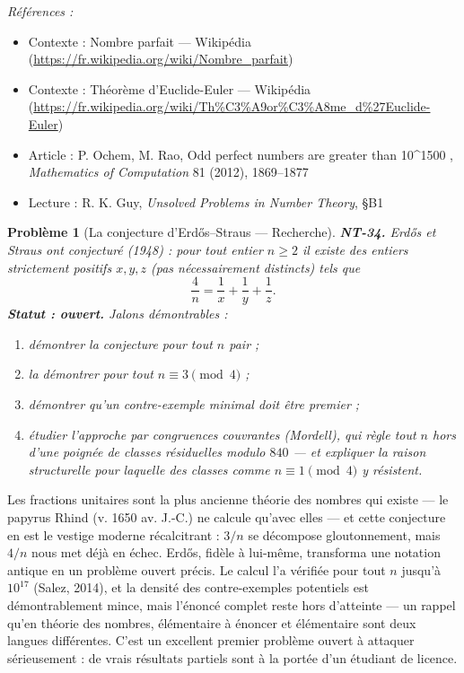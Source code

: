 \documentclass[11pt]{article}
\newtheorem{problem}{Problème}
\newenvironment{refs}{\par\small\noindent\emph{Références :}\begin{itemize}\setlength\itemsep{0pt}}{\end{itemize}\normalsize}
\begin{document}
\begin{refs}
\item Contexte : Nombre parfait --- Wikipédia (\url{https://fr.wikipedia.org/wiki/Nombre_parfait})
\item Contexte : Théorème d'Euclide-Euler --- Wikipédia (\url{https://fr.wikipedia.org/wiki/Th%C3%A9or%C3%A8me_d%27Euclide-Euler})
\item Article : P. Ochem, M. Rao, \og{} Odd perfect numbers are greater than 10\textasciicircum{}1500 \fg{}, \textit{Mathematics of Computation} 81 (2012), 1869--1877
\item Lecture : R. K. Guy, \textit{Unsolved Problems in Number Theory}, \S{}B1
\end{refs}

\bigskip

\begin{problem}[{La conjecture d'Erd\H{o}s--Straus --- Recherche}]
\textbf{NT-34.} Erd\H{o}s et Straus ont conjecturé (1948) : pour tout
entier $n \ge 2$ il existe des entiers strictement positifs $x, y, z$ (pas nécessairement
distincts) tels que
\[ \frac{4}{n} = \frac{1}{x} + \frac{1}{y} + \frac{1}{z}. \]
\textbf{Statut : ouvert.} Jalons démontrables :
\begin{enumerate}
\item[(i)] démontrer la conjecture pour tout $n$ pair ;
\item[(ii)] la démontrer pour tout $n \equiv 3 \pmod 4$ ;
\item[(iii)] démontrer qu'un contre-exemple minimal
doit être premier ;
\item[(iv)] étudier l'approche par congruences couvrantes (Mordell), qui règle
tout $n$ hors d'une poignée de classes résiduelles modulo $840$ --- et expliquer la raison
structurelle pour laquelle des classes comme $n \equiv 1 \pmod 4$ y résistent.
\end{enumerate}

\end{problem}

\noindent Les fractions unitaires sont la plus ancienne théorie des nombres qui existe --- le
papyrus Rhind (v. 1650 av. J.-C.) ne calcule qu'avec elles --- et cette conjecture en est le vestige
moderne récalcitrant : $3/n$ se décompose gloutonnement, mais $4/n$ nous met déjà en échec.
Erd\H{o}s, fidèle à lui-même, transforma une notation antique en un problème ouvert précis. Le calcul
l'a vérifiée pour tout $n$ jusqu'à $10^{17}$ (Salez, 2014), et la densité des contre-exemples
potentiels est démontrablement mince, mais l'énoncé complet reste hors d'atteinte --- un rappel qu'en
théorie des nombres, \og{} élémentaire à énoncer \fg{} et \og{} élémentaire \fg{} sont deux langues différentes.
C'est un excellent premier problème ouvert à attaquer sérieusement : de vrais résultats partiels sont
à la portée d'un étudiant de licence.
\end{document}
